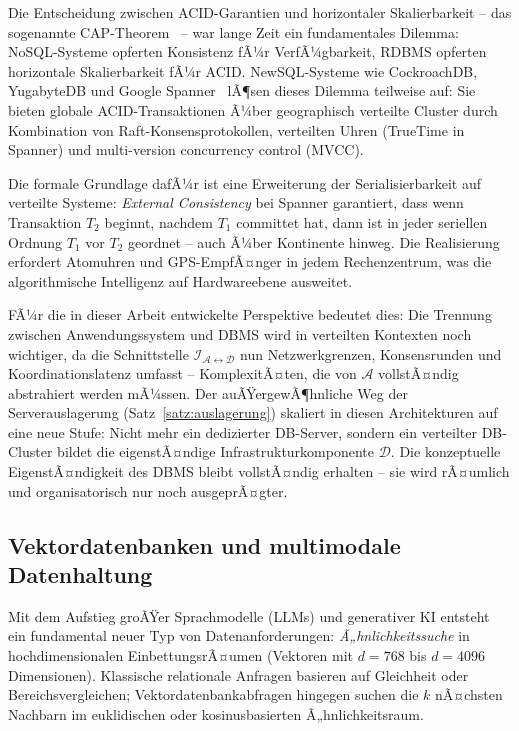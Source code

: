 ﻿\documentclass[a4paper,12pt]{article}
\theoremstyle{definition}
\begin{document}
Die Entscheidung zwischen ACID-Garantien und horizontaler Skalierbarkeit -- das sogenannte CAP-Theorem~\cite{brewer2000cap} -- war lange Zeit ein fundamentales Dilemma: NoSQL-Systeme opferten Konsistenz fÃ¼r VerfÃ¼gbarkeit, RDBMS opferten horizontale Skalierbarkeit fÃ¼r ACID. NewSQL-Systeme wie CockroachDB, YugabyteDB und Google Spanner~\cite{corbett2013spanner} lÃ¶sen dieses Dilemma teilweise auf: Sie bieten globale ACID-Transaktionen Ã¼ber geographisch verteilte Cluster durch Kombination von Raft-Konsensprotokollen, verteilten Uhren (TrueTime in Spanner) und multi-version concurrency control (MVCC).

Die formale Grundlage dafÃ¼r ist eine Erweiterung der Serialisierbarkeit auf verteilte Systeme: \emph{External Consistency} bei Spanner garantiert, dass wenn Transaktion $T_2$ beginnt, nachdem $T_1$ committet hat, dann ist in jeder seriellen Ordnung $T_1$ vor $T_2$ geordnet -- auch Ã¼ber Kontinente hinweg. Die Realisierung erfordert Atomuhren und GPS-EmpfÃ¤nger in jedem Rechenzentrum, was die algorithmische Intelligenz auf Hardwareebene ausweitet.

FÃ¼r die in dieser Arbeit entwickelte Perspektive bedeutet dies: Die Trennung zwischen Anwendungssystem und DBMS wird in verteilten Kontexten noch wichtiger, da die Schnittstelle $\mathcal{I}_{\mathcal{A} \leftrightarrow \mathcal{D}}$ nun Netzwerkgrenzen, Konsensrunden und Koordinationslatenz umfasst -- KomplexitÃ¤ten, die von $\mathcal{A}$ vollstÃ¤ndig abstrahiert werden mÃ¼ssen. Der auÃŸergewÃ¶hnliche Weg der Serverauslagerung (Satz~\ref{satz:auslagerung}) skaliert in diesen Architekturen auf eine neue Stufe: Nicht mehr ein dedizierter DB-Server, sondern ein verteilter DB-Cluster bildet die eigenstÃ¤ndige Infrastrukturkomponente $\mathcal{D}$. Die konzeptuelle EigenstÃ¤ndigkeit des DBMS bleibt vollstÃ¤ndig erhalten -- sie wird rÃ¤umlich und organisatorisch nur noch ausgeprÃ¤gter.

\subsection{Vektordatenbanken und multimodale Datenhaltung}

Mit dem Aufstieg groÃŸer Sprachmodelle (LLMs) und generativer KI entsteht ein fundamental neuer Typ von Datenanforderungen: \emph{Ã„hnlichkeitssuche} in hochdimensionalen EinbettungsrÃ¤umen (Vektoren mit $d = 768$ bis $d = 4096$ Dimensionen). Klassische relationale Anfragen basieren auf Gleichheit oder Bereichsvergleichen; Vektordatenbankabfragen hingegen suchen die $k$ nÃ¤chsten Nachbarn im euklidischen oder kosinusbasierten Ã„hnlichkeitsraum.
\end{document}
